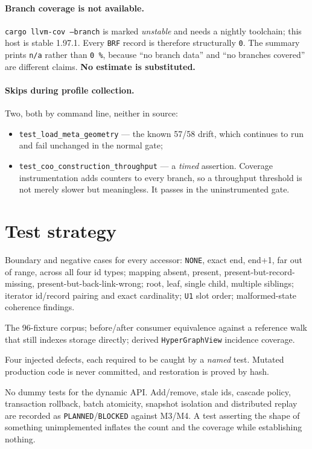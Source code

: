 \documentclass[11pt,a4paper]{article}
\newcommand{\code}[1]{\texttt{#1}}
\begin{document}
\paragraph{Branch coverage is not available.} \code{cargo llvm-cov --branch} is
marked \emph{unstable} and needs a nightly toolchain; this host is stable
1.97.1. Every \code{BRF} record is therefore structurally \code{0}. The summary
prints \code{n/a} rather than \code{0\,\%}, because ``no branch data'' and ``no
branches covered'' are different claims. \textbf{No estimate is substituted.}

\paragraph{Skips during profile collection.} Two, both by command line, neither
in source:
\begin{itemize}\itemsep2pt
  \item \code{test\_load\_meta\_geometry} --- the known 57/58 drift, which
        continues to run and fail unchanged in the normal gate;
  \item \code{test\_coo\_construction\_throughput} --- a \emph{timed} assertion.
        Coverage instrumentation adds counters to every branch, so a throughput
        threshold is not merely slower but meaningless. It passes in the
        uninstrumented gate.
\end{itemize}

\section{Test strategy}

\begin{description}\itemsep3pt
\item[Verification] Boundary and negative cases for every accessor: \code{NONE},
  exact end, end+1, far out of range, across all four id types; mapping absent,
  present, present-but-record-missing, present-but-back-link-wrong; root, leaf,
  single child, multiple siblings; iterator id/record pairing and exact
  cardinality; \code{U1} slot order; malformed-state coherence findings.
\item[Validation] The 96-fixture corpus; before/after consumer equivalence
  against a reference walk that still indexes storage directly; derived
  \code{HyperGraphView} incidence coverage.
\item[Test strength] Four injected defects, each required to be caught by a
  \emph{named} test. Mutated production code is never committed, and restoration
  is proved by hash.
\item[Not written] No dummy tests for the dynamic API. Add/remove, stale ids,
  cascade policy, transaction rollback, batch atomicity, snapshot isolation and
  distributed replay are recorded as \code{PLANNED}/\code{BLOCKED} against M3/M4.
  A test asserting the shape of something unimplemented inflates the count and
  the coverage while establishing nothing.
\end{description}
\end{document}
